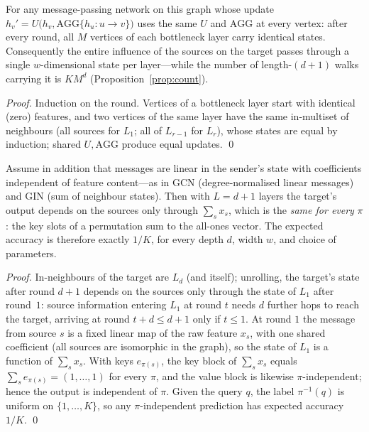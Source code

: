 \begin{proposition}\label{prop:collapse}
For any message-passing network on this graph whose update
$h_v' = U\bigl(h_v,\mathrm{AGG}\{h_u : u\to v\}\bigr)$ uses the same $U$ and
$\mathrm{AGG}$ at every vertex: after every round, all $M$ vertices of each
bottleneck layer carry identical states. Consequently the entire influence of
the sources on the target passes through a single $w$-dimensional state per
layer---while the number of length-$(d{+}1)$ walks carrying it is $K M^{d}$
(Proposition~\ref{prop:count}).
\end{proposition}

\begin{proof}
Induction on the round. Vertices of a bottleneck layer start with identical
(zero) features, and two vertices of the same layer have the same in-multiset
of neighbours (all sources for $L_1$; all of $L_{r-1}$ for $L_r$), whose states
are equal by induction; shared $U,\mathrm{AGG}$ produce equal updates. \qed
\end{proof}

\begin{proposition}
\label{prop:blind}
Assume in addition that messages are linear in the sender's state with
coefficients independent of feature content---as in GCN (degree-normalised
linear messages) and GIN (sum of neighbour states). Then with $L=d+1$ layers
the target's output depends on the sources only through $\sum_{s}x_s$, which is
the \emph{same for every} $\pi$: the key slots of a permutation sum to the
all-ones vector. The expected accuracy is therefore exactly $1/K$, for every
depth $d$, width $w$, and choice of parameters.
\end{proposition}

\begin{proof}
In-neighbours of the target are $L_d$ (and itself); unrolling, the target's
state after round $d{+}1$ depends on the sources only through the state of
$L_1$ after round~$1$: source information entering $L_1$ at round $t$ needs $d$
further hops to reach the target, arriving at round $t+d\le d+1$ only if
$t\le1$. At round $1$ the message from source $s$ is a fixed linear map of the
raw feature $x_s$, with one shared coefficient (all sources are isomorphic in
the graph), so the state of $L_1$ is a function of $\sum_s x_s$. With keys
$e_{\pi(s)}$, the key block of $\sum_s x_s$ equals $\sum_s e_{\pi(s)}
=(1,\dots,1)$ for every $\pi$, and the value block is likewise
$\pi$-independent; hence the output is independent of $\pi$. Given the query
$q$, the label $\pi^{-1}(q)$ is uniform on $\{1,\dots,K\}$, so any
$\pi$-independent prediction has expected accuracy $1/K$. \qed
\end{proof}

